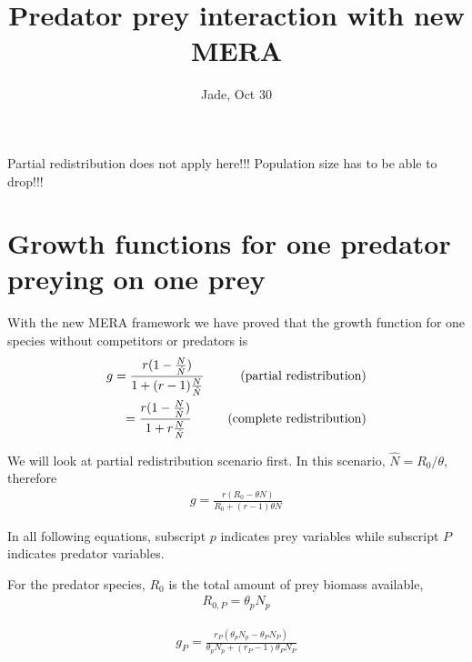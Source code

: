 \documentclass[12pt]{article}
\date{}
\title{\Large \textbf{Predator prey interaction with new MERA}}
\author{Jade, Oct 30}
\begin{document}
\maketitle
\raggedright
\large
\setlength{\parindent}{15pt}

Partial redistribution does not apply here!!! Population size has to be able to drop!!!

\section{Growth functions for one predator preying on one prey}

With the new MERA framework we have proved that the growth function for one species without competitors or predators is 
  \begin{equation}
 \begin{split}
g =  \frac{r (1 - \frac{N}{\hat {N}})}{1 + (r-1) \frac{N}{\hat {N}}} \hskip 1cm \mbox{(partial redistribution)}\\
= \frac{ r(1- \frac{N }{\hat{N}})} {1+ r \frac{N }{\hat{N}}}\hskip 1cm \mbox{(complete redistribution)}
\end{split}
\end{equation}

We will look at partial redistribution scenario first. In this scenario, $\hat {N} = R_0/\theta$, therefore
  \begin{equation}
 \begin{split}
g =  \frac{r (R_0 - \theta N)}{R_0 + (r-1) \theta N} 
\end{split}
\end{equation}

In all following equations, subscript $p$ indicates prey variables while subscript $P$ indicates predator variables. 

For the predator species, $R_0$ is the total amount of prey biomass available,
  \begin{equation}
 \begin{split}
R_{0,P}  = \theta_{p}N_{p} 
\end{split}
\end{equation}

 \begin{equation}
 \begin{split}
g_{P} =  \frac{r_{P} (\theta_{p} N_{p} - \theta_{P} N_{P} )}{ \theta_{p}N_{p} + (r_{P}-1) \theta_{P} N_{P}} 
\end{split}
\end{equation}
\end{document}
